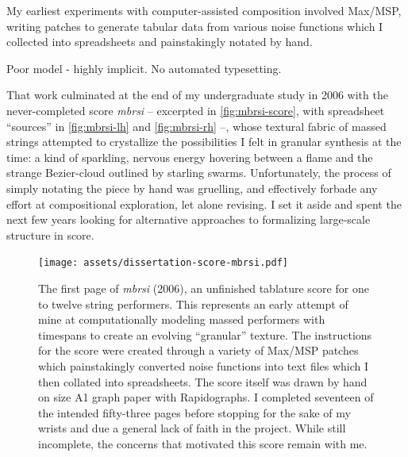 My earliest experiments with computer-assisted composition involved Max/MSP,
writing patches to generate tabular data from various noise functions which I
collected into spreadsheets and painstakingly notated by hand.

Poor model - highly implicit. No automated typesetting.

That work culminated at the end of my undergraduate study in 2006 with the
never-completed score \emph{mbrsi} -- excerpted in \autoref{fig:mbrsi-score},
with spreadsheet \enquote{sources} in \autoref{fig:mbrsi-lh} and
\autoref{fig:mbrsi-rh} --, whose textural fabric of massed strings attempted to
crystallize the possibilities I felt in granular synthesis at the time: a kind
of sparkling, nervous energy hovering between a flame and the strange
Bezier-cloud outlined by starling swarms. Unfortunately, the process of simply
notating the piece by hand was gruelling, and effectively forbade any effort at
compositional exploration, let alone revising. I set it aside and spent the
next few years looking for alternative approaches to formalizing large-scale
structure in score.

\begin{figure}[H]
\begin{centering}
\texttt{[image: assets/dissertation-score-mbrsi.pdf]}
\caption{The first page of \emph{mbrsi} (2006), an unfinished tablature score
for one to twelve string performers. This represents an early attempt of mine
at computationally modeling massed performers with timespans to create an
evolving \enquote{granular} texture. The instructions for the score were
created through a variety of Max/MSP patches which painstakingly converted
noise functions into text files which I then collated into spreadsheets. The
score itself was drawn by hand on size A1 graph paper with Rapidographs.
I completed seventeen of the intended fifty-three pages before stopping for the
sake of my wrists and due a general lack of faith in the project. While still
incomplete, the concerns that motivated this score remain with me.}
\label{fig:mbrsi-score}
\end{centering} 
\end{figure}

